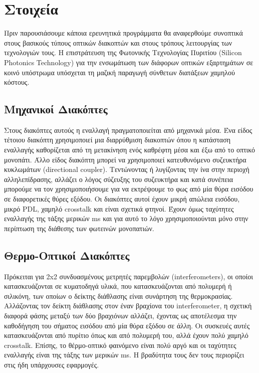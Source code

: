 ﻿
\section{Στοιχεία}



Πριν παρουσιάσουμε κάποια ερευνητικά προγράμματα θα αναφερθούμε 
συνοπτικά στους βασικούς τύπους οπτικών διακοπτών και στους τρόπους 
λειτουργίας των τεχνολογιών τους. 
Η επιστράτευση της Φωτονικής Τεχνολογίας Πυριτίου (Silicon Photonics
Technology) για την ενσωμάτωση των διάφορων οπτικών εξαρτημάτων σε
κοινό υπόστρωμα υπόσχεται τη μαζική παραγωγή σύνθετων διατάξεων
χαμηλού κόστους.

\subsection{Μηχανικοί Διακόπτες}

Στους διακόπτες αυτούς η εναλλαγή πραγματοποιείται από μηχανικά
μέσα. Ένα είδος τέτοιου διακόπτη χρησιμοποιεί μια διαρρύθμιση
διακοπτών όπου η κατάσταση εναλλαγής καθορίζεται από τη μετακίνηση
ενός καθρέφτη μέσα και έξω από το οπτικό μονοπάτι. Άλλο είδος διακόπτη
μπορεί να χρησιμοποιεί κατευθυνόμενο συζευκτήρα κυκλωμάτων
(directional coupler). Τεντώνοντας ή λυγίζοντας την ίνα στην περιοχή
αλληλεπίδρασης, αλλάζει ο λόγος σύζευξης του συζευκτήρα και κατά
συνέπεια μπορούμε να τον χρησιμοποιήσουμε για να εκτρέψουμε το φως από
μία θύρα εισόδου σε διαφορετικές θύρες εξόδου. Οι διακόπτες αυτοί
έχουν μικρή απώλεια εισόδου, μικρό PDL, χαμηλό crosstalk και είναι
σχετικά φτηνοί. Έχουν όμως ταχύτητες εναλλαγής της τάξης μερικών ms
και για αυτό το λόγο χρησιμοποιούνται μόνο στην περίπτωση της διάθεσης
των φωτεινών μονοπατιών.

\subsection{Θερμο-Οπτικοί Διακόπτες}

Πρόκειται για 2x2 συνδυασμένους μετρητές παρεμβολών (interferometers),
οι οποίοι κατασκευάζονται σε κυματοδηγά υλικά, που κατασκευάζονται από
πολυμερή ή σιλικόνη, των οποίων ο δείκτης διάθλασης είναι συνάρτηση
της θερμοκρασίας. Αλλάζοντας τον δείκτη διάθλασης στον έναν βραχίονα
του interferometer, η σχετική διαφορά φάσης μεταξύ των δύο βραχιόνων
αλλάζει, έχοντας ως αποτέλεσμα την καθοδήγηση του σήματος εισόδου από
μία θύρα εξόδου σε άλλη.  Οι συσκευές αυτές κατασκευάζονται από
πυρίτιο όπως και από πολυμερή του, αλλά έχουν πολύ χαμηλό
crosstalk. Επίσης, το θέρμο-οπτικό φαινόμενο είναι πολύ αργό και οι
ταχύτητες εναλλαγής είναι της τάξης των μερικών ms. Η βραδύτητα τους
δεν τους περιορίζει στις ήδη υπάρχουσες εφαρμογές.

